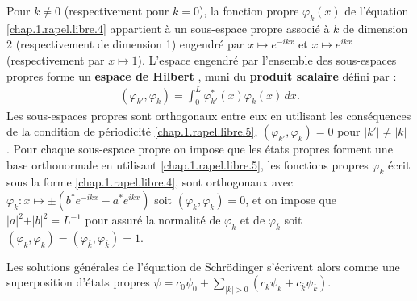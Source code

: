 \medskip

Pour $k \neq 0 $ (respectivement pour $k = 0$), la fonction propre $\varphi_k(x)$ de l’équation \eqref{chap.1.rapel.libre.4} appartient à un sous-espace propre associé à $k$ de dimension 2 (respectivement de dimension 1) engendré par $x \mapsto e^{-ikx}$ et $x \mapsto e^{ikx}$ (respectivement par $x \mapsto 1$).
L’espace engendré par l’ensemble des sous-espaces propres forme un {\bf espace de Hilbert} , muni du {\bf produit scalaire} défini par :
\begin{eqnarray}
	( \varphi_{k'} , \varphi_{k} ) = \int_0^L \varphi_{k'}^\ast(x) \varphi_{k}(x) \, dx .\label{chap.1.rapel.libre.5}
\end{eqnarray}
Les sous-espaces propres sont orthogonaux entre eux \ie en utilisant les conséquences de la condition de périodicité \eqref{chap.1.rapel.libre.5}, $( \varphi_{k'} , \varphi_{k} ) = 0$ pour $\vert k' \vert \neq \vert k \vert  $ . 
Pour chaque sous-espace propre on impose que les états propres forment une base orthonormale \ie en utilisant \eqref{chap.1.rapel.libre.5}, les fonctions propres $\varphi_{k}$ écrit sous la forme \eqref{chap.1.rapel.libre.4}, sont orthogonaux avec $\varphi_{\overline{k}} \colon x \mapsto \pm ( b^\ast e^{-ikx} - a^\ast e^{ikx} )$  soit $(\varphi_{\overline{k}} , \varphi_{k} ) = 0$, et on impose que  $ \vert a \vert^2 + \vert b \vert^2 = L^{-1}$ pour assuré la normalité  de $\varphi_{k}$  et de $\varphi_{\overline{k}}$ soit  $( \varphi_{k} , \varphi_{k} ) = (\varphi_{\overline{k}} , \varphi_{\overline{k}})   = 1$. 

\medskip

Les solutions générales de l’équation de Schrödinger s’écrivent alors comme une superposition d’états propres  $\psi = c_0 \psi_0 +  \sum_{\vert k \vert > 0 } (c_k \psi_k  + c_{\overline{k}} \psi_{\overline{k}}) $. 

